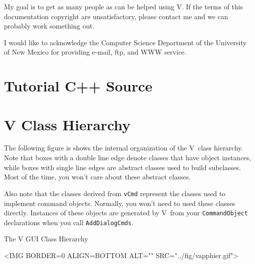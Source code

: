 \documentclass[letterpaper,draft]{book}
\newcommand{\code}{\texttt}
\newcommand{\V}{V}
\begin{document}
My goal is to get as many people as can be helped using \V\@. If
the terms of this documentation copyright are unsatisfactory, please
contact me and we can probably work something out.

I would like to acknowledge the Computer Science Department of the
University of New Mexico for providing e-mail, ftp, and WWW service.












\appendix
\chapter{Tutorial C++ Source}












\chapter{V Class Hierarchy}

The following figure is shows the internal organization of the \V\
class hierarchy. Note that boxes with a double line edge denote
classes that
have object instances, while boxes with single line edges are abstract
classes used to build subclasses.  Most of the time, you won't care
about these abstract classes.

Also note that the classes derived from \code{vCmd} represent the
classes used to implement command objects. Normally, you won't need
to used these classes directly. Instances of these objects are generated
by \V\ from your \code{CommandObject} declarations when you call
\code{AddDialogCmds}.
\newpage
\begin{center}
{\Large The V GUI Class Hierarchy}
\end{center}

\begin{center}
\vspace{.1in}
\small
\begin{rawhtml}
<IMG BORDER=0 ALIGN=BOTTOM ALT="" SRC="../fig/vapphier.gif">
\end{rawhtml}

\begin{latexonly}

\end{latexonly}
\normalfont\normalsize
\end{center}
\end{document}
